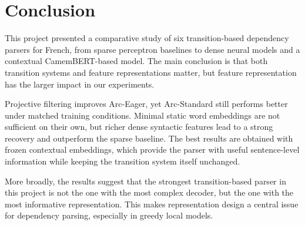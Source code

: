 \documentclass[12pt,letterpaper]{article}
\begin{document}
\section{Conclusion}
\label{sec:conclusion}

This project presented a comparative study of six transition-based dependency
parsers for French, from sparse perceptron baselines to dense neural models
and a contextual CamemBERT-based model. The main conclusion is that both
transition systems and feature representations matter, but feature
representation has the larger impact in our experiments.

Projective filtering improves Arc-Eager, yet Arc-Standard still performs
better under matched training conditions. Minimal static word embeddings are
not sufficient on their own, but richer dense syntactic features lead to a
strong recovery and outperform the sparse baseline. The best results are
obtained with frozen contextual embeddings, which provide the parser with
useful sentence-level information while keeping the transition system itself
unchanged.

More broadly, the results suggest that the strongest transition-based parser
in this project is not the one with the most complex decoder, but the one
with the most informative representation. This makes representation design a
central issue for dependency parsing, especially in greedy local models.
\end{document}

